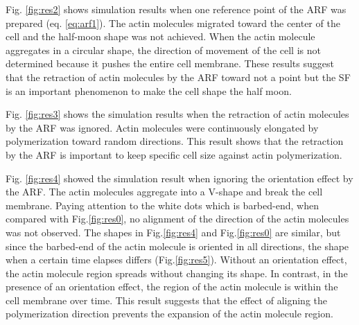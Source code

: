 \documentclass[a4paper,12pt, oneside]{book}
\begin{document}
Fig. \ref{fig:res2} shows simulation results when one reference point of the ARF was prepared (eq. \ref{eq:arf1}).
The actin molecules migrated toward the center of the cell and the half-moon shape was not achieved.
When the actin molecule aggregates in a circular shape, the direction of movement of the cell is not determined because it pushes the entire cell membrane.
These results suggest that the retraction of actin molecules by the ARF toward not a point but the SF is an important phenomenon to make the cell shape the half moon.

Fig. \ref{fig:res3} shows the simulation results when the retraction of actin molecules by the ARF was ignored.
Actin molecules were continuously elongated by  polymerization toward  random directions.
This result shows that the retraction by the ARF is important to keep specific cell size against actin polymerization.

Fig. \ref{fig:res4} showed the simulation result when ignoring the orientation effect by the ARF.
The actin molecules aggregate into a V-shape and break the cell membrane.
Paying attention to the white dots which is barbed-end, when compared with Fig.\ref{fig:res0}, no alignment of the direction of the actin molecules was not observed.
The shapes in Fig.\ref{fig:res4} and Fig.\ref{fig:res0} are similar, but since the barbed-end of the actin molecule is oriented in all directions, the shape when a certain time elapses differs (Fig.\ref{fig:res5}).
Without an orientation effect, the actin molecule region spreads without changing its shape.
In contrast, in the presence of an orientation effect, the region of the actin molecule is within the cell membrane over time.
This result suggests that the effect of aligning the polymerization direction prevents the expansion of the actin molecule region.
\end{document}
